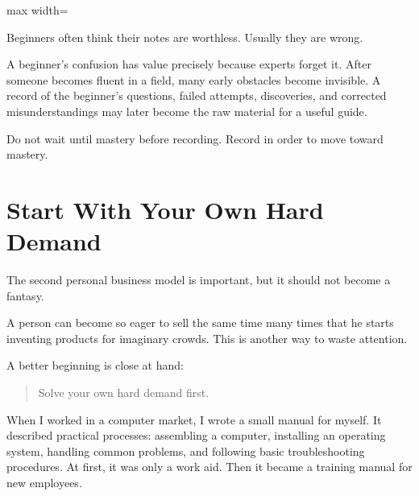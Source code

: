 \begin{center}
\begin{adjustbox}{max width=\linewidth}
\end{adjustbox}
\end{center}

Beginners often think their notes are worthless. Usually they are wrong.

A beginner's confusion has value precisely because experts forget it. After someone becomes fluent in a field, many early obstacles become invisible. A record of the beginner's questions, failed attempts, discoveries, and corrected misunderstandings may later become the raw material for a useful guide.

Do not wait until mastery before recording. Record in order to move toward mastery.

\section*{Start With Your Own Hard Demand}

The second personal business model is important, but it should not become a fantasy.

A person can become so eager to sell the same time many times that he starts inventing products for imaginary crowds. This is another way to waste attention.

A better beginning is close at hand:

\begin{quote}
Solve your own hard demand first.
\end{quote}

When I worked in a computer market, I wrote a small manual for myself. It described practical processes: assembling a computer, installing an operating system, handling common problems, and following basic troubleshooting procedures. At first, it was only a work aid. Then it became a training manual for new employees.

